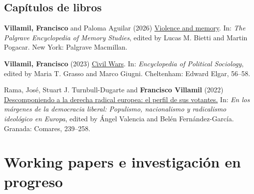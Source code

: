 \documentclass[a4paper, 12pt]{article}
\begin{document}
\subsection*{Capítulos de libros}

\begin{etaremune}[leftmargin=12pt, itemsep=0pt]
\item \textbf{Villamil, Francisco} and Paloma Aguilar (2026) \href{https://doi.org/10.1007/978-3-030-93789-8_49-1}{Violence and memory}. In: \textit{The Palgrave Encyclopedia of Memory Studies}, edited by Lucas M. Bietti and Martin Pogacar. New York: Palgrave Macmillan. %
\item \textbf{Villamil, Francisco} (2023) \href{https://doi.org/10.4337/9781803921235.00020}{Civil Wars}. In: \textit{Encyclopedia of Political Sociology}, edited by Maria T. Grasso and Marco Giugni. Cheltenham: Edward Elgar, 56--58. %
\item Rama, José, Stuart J. Turnbull-Dugarte and \textbf{Francisco Villamil} (2022) \href{https://www.comares.com/libro/en-los-margenes-de-la-democracia-liberal_143816/}{Descomponiendo a la derecha radical europea: el perfil de sus votantes.} In: \textit{En los márgenes de la democracia liberal: Populismo, nacionalismo y radicalismo ideológico en Europa}, edited by Ángel Valencia and Belén Fernández-García. Granada: Comares, 239--258. %
\end{etaremune}

\section*{Working papers e investigación en progreso}
\end{document}
